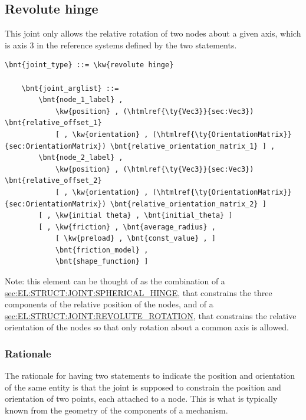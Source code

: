 \subsection{Revolute hinge}
\label{sec:EL:STRUCT:JOINT:REVOLUTE_HINGE}
This joint only allows the relative rotation of two nodes about
a given axis, which is axis 3 in the reference systems defined 
by the two  statements.
\begin{Verbatim}[commandchars=\\\{\}]
    \bnt{joint_type} ::= \kw{revolute hinge}

    \bnt{joint_arglist} ::= 
        \bnt{node_1_label} ,
            \kw{position} , (\htmlref{\ty{Vec3}}{sec:Vec3}) \bnt{relative_offset_1}
            [ , \kw{orientation} , (\htmlref{\ty{OrientationMatrix}}{sec:OrientationMatrix}) \bnt{relative_orientation_matrix_1} ] ,
        \bnt{node_2_label} ,
            \kw{position} , (\htmlref{\ty{Vec3}}{sec:Vec3}) \bnt{relative_offset_2}
            [ , \kw{orientation} , (\htmlref{\ty{OrientationMatrix}}{sec:OrientationMatrix}) \bnt{relative_orientation_matrix_2} ]
        [ , \kw{initial theta} , \bnt{initial_theta} ]
        [ , \kw{friction} , \bnt{average_radius} , 
            [ \kw{preload} , \bnt{const_value} , ]
            \bnt{friction_model} , 
            \bnt{shape_function} ]
\end{Verbatim}

Note: this element can be thought of as the combination of a 
\hyperref{\kw{spherical hinge}}{\kw{spherical hinge} (see Section~}{)}{sec:EL:STRUCT:JOINT:SPHERICAL_HINGE},
that constrains the three components of the relative position
of the nodes, and of a
\hyperref{\kw{revolute rotation}}{\kw{revolute rotation} (see Section~}{)}{sec:EL:STRUCT:JOINT:REVOLUTE_ROTATION},
that constrains the relative orientation of the nodes so that only rotation
about a common axis is allowed.

\subsubsection{Rationale}
The rationale for having two statements to indicate the position
and orientation of the same entity is that the joint is supposed
to constrain the position and orientation of two points,
each attached to a node.
This is what is typically known from the geometry of the components
of a mechanism.

